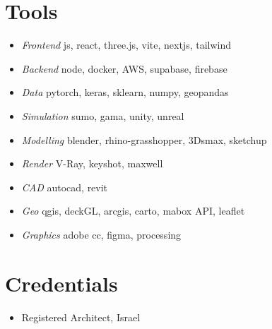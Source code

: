 \section*{Tools}

\begin{itemize}
    \item \textit{Frontend} \tab js, react, three.js, vite, nextjs, tailwind
    \item \textit{Backend} \tab node, docker, AWS, supabase, firebase
    \item \textit{Data} \tab pytorch, keras, sklearn, numpy, geopandas
    \item \textit{Simulation} \tab sumo, gama, unity, unreal
    \item \textit{Modelling} \tab blender, rhino-grasshopper, 3Dsmax, sketchup
    \item \textit{Render} \tab V-Ray, keyshot, maxwell
    \item \textit{CAD} \tab autocad, revit
    \item \textit{Geo} \tab qgis, deckGL, arcgis, carto, mabox API, leaflet
    \item \textit{Graphics} \tab adobe cc, figma, processing
\end{itemize}

\section*{Credentials}

\begin{itemize}
    \item Registered Architect, Israel
\end{itemize}



















